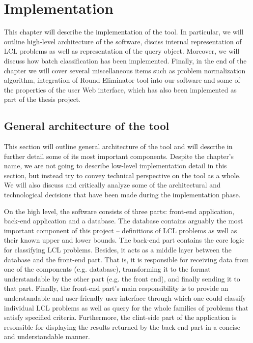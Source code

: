 \chapter{Implementation}
\label{chapter:implementation}

This chapter will describe the implementation of the tool.
In particular, we will outline high-level architecture of
the software, disciss internal representation of
LCL problems as well as representation of the query object.
Moreover, we will discuss how batch classification has been
implemented. Finally, in the end of the chapter we will cover
several miscellaneous items such as problem normalization
algorithm, integration of Round Eliminator tool into
our software and some of the properties of the user Web interface,
which has also been implemented as part of the thesis project.

\section{General architecture of the tool}

This section will outline general architecture of the tool and
will describe in further detail some of its most important
components. Despite the chapter's name, we are not going
to describe low-level implementation detail in this section,
but instead try to convey technical perspective on the tool
as a whole. We will also discuss and critically analyze some
of the architectural and technological decisions that have been
made during the implementation phase.

On the high level, the software consists of three parts:
front-end application, back-end application and a database.
The database contains arguably the most important component
of this project -- definitions of LCL problems as well as their
known upper and lower bounds. The back-end part contains
the core logic for classifying LCL problems. Besides, it acts
as a middle layer between the database and the front-end part.
That is, it is responsible for receiving data from one of the
components (e.g. database), transforming it to the
format understandable by the other part (e.g. the front end),
and finally sending it to that part. Finally, the
front-end part's main responsibility is to provide
an understandable and user-friendly user interface
through which one could classify individual LCL problems
as well as query for the whole families of problems
that satisfy specified criteria. Furthermore,
the clint-side part of the application is
resonsible for displaying the results returned by the
back-end part in a concise and understandable manner.

